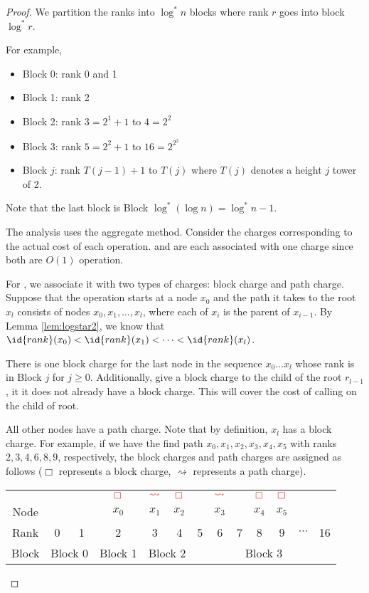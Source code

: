 \begin{proof}
    We partition the ranks into $\log^* n$ blocks where rank $r$ goes into block $\log^* r$.

    For example,
    \begin{itemize}
        \item Block 0: rank 0 and 1
        \item Block 1: rank 2
        \item Block 2: rank $3=2^1 + 1$  to $4 = 2^2$ 
        \item Block 3: rank $5=2^2 + 1$  to $16=2^{2^2}$ 
        \item Block $j$: rank $T(j-1)+1$ to $T(j)$ where $T(j)$ denotes a height $j$ tower of 2. 
    \end{itemize}

    Note that the last block is Block $\log^*(\log n) = \log^*n - 1$.
    
    The analysis uses the aggregate method. Consider the charges corresponding to the actual cost of each operation.  and  are each associated with one charge since both are $O(1)$ operation.

    For , we associate it with two types of charges: block charge and path charge. Suppose that the  operation starts at a node $x_0$ and the path it takes to the root $x_l$ consists of nodes $x_0,x_1,\ldots,x_l$, where each of $x_i$ is the parent of $x_{i-1}$. By Lemma \ref{lem:logstar2}, we know that $\id{rank}(x_0) < \id{rank}(x_1) < \cdots < \id{rank}(x_l)$.
    
    There is one block charge for the last node in the sequence $x_0 \ldots x_l$ whose rank is in Block $j$ for $j\geq 0$. Additionally, give a block charge to the child of the root $r_{l-1}$, it it does not already have a block charge. This will cover the cost of calling  on the child of root.

    All other nodes have a path charge. Note that by definition, $x_l$ has a block charge. For example, if we have the find path $x_0,x_1,x_2,x_3,x_4,x_5$ with ranks $2,3,4,6,8,9$, respectively, the block charges and path charges are assigned as follows ($\Box$ represents a block charge, $\rightsquigarrow$ represents a path charge).

    \begin{tabular}{c||cc|c|cc|ccccccc}
        &&& $\color{red}\Box$ & $\color{red}\rightsquigarrow$ & $\color{red}\Box$ & & $\color{red}\rightsquigarrow$ && $\color{red}\Box$ & $\color{red}\Box$ \\
        Node & & & $x_0$ & $x_1$ & $x_2$ & & $x_3$ & & $x_4$ & $x_5$ \\
        \hline
        Rank & 0 & 1 & 2 & 3 & 4 & 5 & 6 & 7 & 8 & 9 & $\cdots$ & 16 \\
        Block & \multicolumn{2}{c|}{Block 0} & Block 1 & \multicolumn{2}{c|}{Block 2} & \multicolumn{7}{c}{Block 3}
    \end{tabular}


\end{proof}

